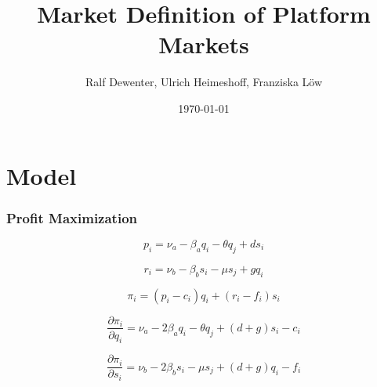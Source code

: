 \documentclass[12pt,a4paper]{scrreprt}
\begin{document}
\title{Market Definition of Platform Markets}
\date{\today}
\author{Ralf Dewenter, Ulrich Heimeshoff, Franziska Löw}

\maketitle




\chapter{Model}

\subsection{Profit Maximization}\label{appendix_model}

\begin{equation}
p_i=\nu_a-\beta_a q_i - \theta q_j +ds_i
\end{equation}

\begin{equation}
r_i=\nu_b-\beta_b s_i - \mu s_j +gq_i
\end{equation} 

\begin{equation}\label{eq:profit}
\pi_i=(p_i-c_i)q_i+(r_i-f_i)s_i
\end{equation}

\begin{equation}
	\frac{\partial \pi_i}{\partial q_i}=\nu_a-2\beta_a q_i-\theta q_j+(d+g)s_i-c_i
\end{equation}

\begin{equation}
	\frac{\partial \pi_i}{\partial s_i}=\nu_b-2\beta_b s_i-\mu s_j+(d+g)q_i-f_i
\end{equation}
\end{document}
